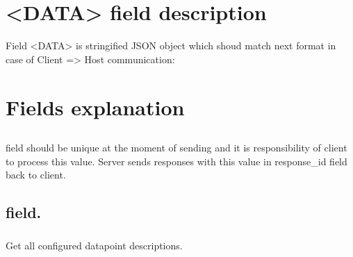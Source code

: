 \documentclass[letterpaper,10pt,english]{sphinxmanual}
\begin{document}
\section{\textless{}DATA\textgreater{} field description}
\label{\detokenize{bdsm:data-field-description}}\label{\detokenize{bdsm:data-field-description}}
Field \textless{}DATA\textgreater{} is stringified JSON object which shoud match next format in case of Client =\textgreater{} Host communication:

%
\begin{sphinxVerbatim}[commandchars=\\\{\}]
   
   
     
\end{sphinxVerbatim}


\section{Fields explanation}
\label{\detokenize{bdsm:fields-explanation}}\label{\detokenize{bdsm:fields-explanation}}

\subsection{}
\label{\detokenize{bdsm:request-id}}\label{\detokenize{bdsm:request-id}}
field should be unique at the moment of sending and it is responsibility of client to process this value. Server sends responses with this value in response\_id field back to client.


\subsection{ field.}
\label{\detokenize{bdsm:method-field}}\label{\detokenize{bdsm:method-field}}

\subsubsection{}
\label{\detokenize{bdsm:get-datapoints}}\label{\detokenize{bdsm:get-datapoints}}
Get all configured datapoint descriptions.
\end{document}
